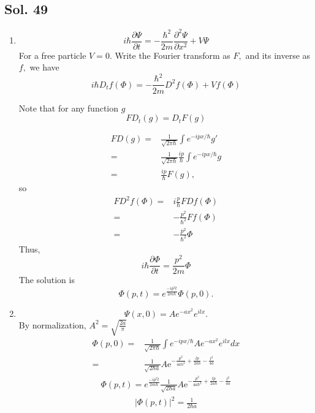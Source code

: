 \subsection*{Sol. 49}
\begin{enumerate}
    \item 
    $$
    i\hbar\frac{\partial \Psi}{\partial t}
    =-\frac{\hbar^2}{2m}
    \frac{\partial^2\Psi}{\partial x^2}+V\Psi
    $$
    For a free particle $V=0.$
    Write the Fourier transform as $F,$ and its inverse as $f,$ we have
    $$
    i\hbar D_t f(\Phi)
    =
    -\frac{\hbar^2}{2m}
    D^2f(\Phi)+Vf(\Phi)
    $$

    Note that for any function $g$
    $$
    FD_t(g) = D_tF(g)
    $$

   \begin{align*}
       FD(g) =& \frac{1}{\sqrt{2\pi\hbar}}
    \int e^{-ipx/\hbar}g'\\
    =&\frac{1}{\sqrt{2\pi\hbar}}
    \frac{ip}{\hbar}
    \int e^{-ipx/\hbar}g\\
    =&\frac{ip}{\hbar}F(g),
   \end{align*}
   so 
   \begin{align*}
       FD^2f(\Phi)=&
       i\frac{p}{\hbar}
       FDf(\Phi)\\
       =&-\frac{p^2}{\hbar^2}
       Ff(\Phi)\\
       =&-\frac{p^2}{\hbar^2}\Phi
   \end{align*}
    Thus,
    $$
    i\hbar\frac{\partial\Phi}{\partial t}
     = 
    \frac{p^2}{2m}
    \Phi
    $$
    The solution is 
    $$
    \Phi(p,t)=
    e^{\frac{-ip^2t}{2m\hbar}}\Phi(p,0).
    $$
    \item 
    $$
    \Psi(x,0)=Ae^{-ax^2}e^{ilx}.
    $$
    By normalization, $A^2=\sqrt{\frac{2a}{\pi}}$
    \begin{align*}
        \Phi(p,0)=&\frac{1}{\sqrt{2\pi\hbar}}
        \int e^{-ipx/\hbar}Ae^{-ax^2}e^{ilx}dx\\
        =&\frac{1}{\sqrt{2\hbar a}}
        A\mathrm{e}^{-\frac{p^{2}}{4ah^{2}} + \frac{lp}{2ah} - \frac{l^{2}}{4a}}
    \end{align*}
    \begin{align*}
        \Phi(p,t)
        =e^{\frac{-ip^2t}{2m\hbar}}
        \frac{1}{\sqrt{2\hbar a}}
        A\mathrm{e}^{-\frac{p^{2}}{4a\hbar^{2}} + \frac{lp}{2a\hbar} - \frac{l^{2}}{4a}}
    \end{align*}
    \begin{align*}
        |\Phi(p,t)|^2
        =
        \frac{1}{2\hbar a}

\end{align*}
\end{enumerate}
